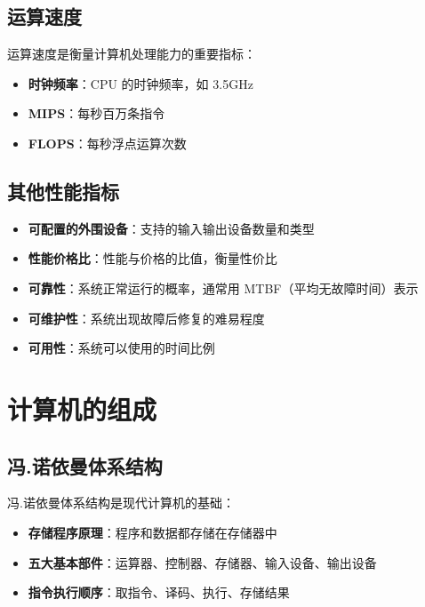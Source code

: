 \documentclass[12pt,UTF8]{ctexbook}
\begin{document}
\section{运算速度}

运算速度是衡量计算机处理能力的重要指标：

\begin{itemize}[leftmargin=2cm]
    \item \textbf{时钟频率}：CPU 的时钟频率，如 3.5GHz
    \item \textbf{MIPS}：每秒百万条指令
    \item \textbf{FLOPS}：每秒浮点运算次数
\end{itemize}

\section{其他性能指标}

\begin{itemize}[leftmargin=2cm]
    \item \textbf{可配置的外围设备}：支持的输入输出设备数量和类型
    \item \textbf{性能价格比}：性能与价格的比值，衡量性价比
    \item \textbf{可靠性}：系统正常运行的概率，通常用 MTBF（平均无故障时间）表示
    \item \textbf{可维护性}：系统出现故障后修复的难易程度
    \item \textbf{可用性}：系统可以使用的时间比例
\end{itemize}

\chapter{计算机的组成}
\label{chap:composition}

\section{冯.诺依曼体系结构}

冯.诺依曼体系结构是现代计算机的基础：

\begin{itemize}[leftmargin=2cm]
    \item \textbf{存储程序原理}：程序和数据都存储在存储器中
    \item \textbf{五大基本部件}：运算器、控制器、存储器、输入设备、输出设备
    \item \textbf{指令执行顺序}：取指令、译码、执行、存储结果
\end{itemize}
\end{document}
